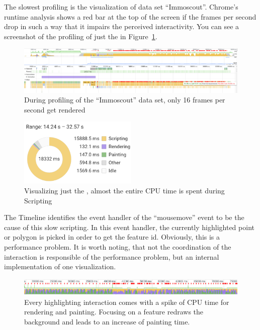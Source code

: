 The slowest profiling is the visualization of data set ``Immoscout''.
Chrome's runtime analysis shows a red bar at the top of the screen if the frames per second drop in such a way that it impairs the perceived interactivity.
You can see a screenshot of the profiling of just the \tmap{} in Figure~\ref{fig:evaluation:performance:profiling:immoscout_tmap_only:fps}.

\begin{figure}[h]
  \centering
  \includegraphics[width=\textwidth]{figures/evaluation/performance/profiles/immoscout_tmap_only/fps}
  \caption{During profiling of the ``Immoscout'' data set, only 16 frames per second get rendered}\label{fig:evaluation:performance:profiling:immoscout_tmap_only:fps}
\end{figure}

\begin{figure}[h]
  \centering
  \includegraphics[width=0.5\textwidth]{figures/evaluation/performance/profiles/immoscout_tmap_only/summary}
  \caption{Visualizing just the \tmap{}, almost the entire CPU time is spent during Scripting }\label{fig:evaluation:performance:profiling:immoscout_tmap_only:summary}
\end{figure}

The Timeline identifies the event handler of the ``mousemove'' event to be the cause of this slow scripting.
In this event handler, the currently highlighted point or polygon is picked in order to get the feature id.
Obviously, this is a performance problem.
It is worth noting, that not the coordination of the interaction is responsible of the performance problem, but an internal implementation of one visualization.

\begin{figure}[h]
  \centering
  \includegraphics[width=\textwidth]{figures/evaluation/performance/profiles/immoscout_both/fps}
  \caption{
    Every highlighting interaction comes with a spike of CPU time for rendering and painting.
    Focusing on a feature redraws the background and leads to an increase of painting time.
  }\label{fig:evaluation:performance:profiling:immoscout_both:fps}
\end{figure}


